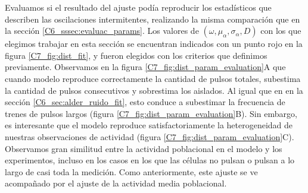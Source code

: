 \documentclass[./main.tex]{subfiles}
\begin{document}
Evaluamos si el resultado del ajuste podía reproducir los estadísticos que describen las oscilaciones intermitentes, realizando la misma comparación que en la sección \ref{C6_sssec:evaluac_params}. Los valores de $(\omega,\mu_{\alpha},\sigma_{\alpha},D)$ con los que elegimos trabajar en esta sección se encuentran indicados con un punto rojo en la figura \ref{C7_fig:dist_fit}, y fueron elegidos con los criterios que definimos previamente. Observamos en la figura \ref{C7_fig:dist_param_evaluation}A que cuando modelo reproduce correctamente la cantidad de pulsos totales, subestima la cantidad de pulsos consecutivos y sobrestima los aislados. Al igual que en en la sección \ref{C6_sec:alder_ruido_fit}, esto conduce a subestimar la frecuencia de trenes de pulsos largos (figura \ref{C7_fig:dist_param_evaluation}B). Sin embargo, es interesante que el modelo reproduce satisfactoriamente la heterogeneidad de nuestras observaciones de actividad (figura \ref{C7_fig:dist_param_evaluation}C). Observamos gran similitud entre la actividad poblacional en el modelo y los experimentos, incluso en los casos en los que las células no pulsan o pulsan a lo largo de casi toda la medición. Como anteriormente, este ajuste se ve acompañado por el ajuste de la actividad media poblacional.
\end{document}
